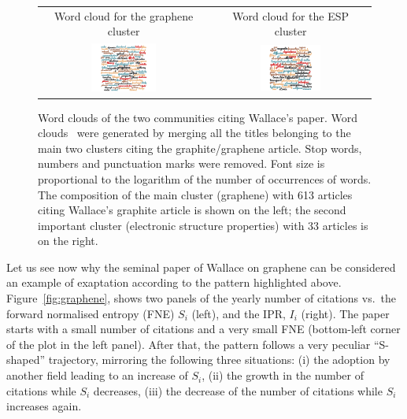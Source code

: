 \documentclass[draft,final]{vutinfth} %
\begin{document}
%
\begin{figure}[t]
    \centering
    \begin{tabular}{cc}
    Word cloud for the graphene cluster&
    Word cloud for the ESP cluster\\
    \includegraphics[width=0.40\textwidth]{figures_exaptation/wordcloud-graphene1.png}&
    \includegraphics[width=0.40\textwidth]{figures_exaptation/wordcloud-graphene2.png}
    \end{tabular}
    \caption{Word clouds of the two communities citing Wallace's paper.
    Word clouds~\cite{wordcloud} were generated by merging all the titles belonging to the main two clusters citing the graphite/graphene article. Stop words, numbers and punctuation marks were removed. Font size is proportional to the logarithm of the number of occurrences of words. The composition of the main cluster (graphene) with 613 articles citing Wallace's graphite article \protect\cite{graphite1947} is shown on the left; the second important cluster (electronic structure properties) with 33 articles is on the right.
    }
    \label{fig:wordclouds}
\end{figure}
%
Let us see now why the seminal paper of Wallace on graphene can be considered an example of exaptation according to the pattern highlighted above. Figure~\ref{fig:graphene}, shows two panels of the yearly number of citations vs.\ the forward normalised entropy (FNE) $S_i$ (left), and the IPR, $I_i$ (right). 
The paper starts with a small number of citations and a very small FNE (bottom-left corner of the plot in the left panel). 
After that, the pattern follows a very peculiar ``S-shaped'' trajectory, mirroring the following three situations: (i) the adoption by another field leading to an increase of $S_i$, (ii) the growth in the number of citations while $S_i$ decreases, (iii) the decrease of the number of citations while $S_i$ increases again.
\end{document}
